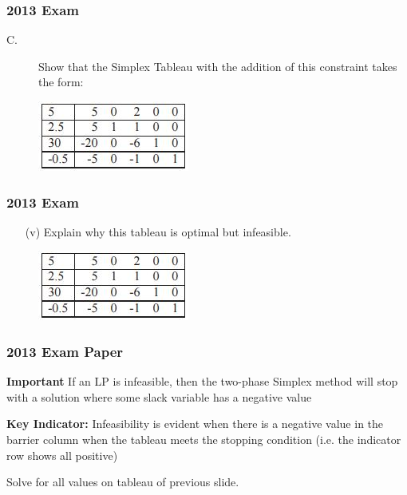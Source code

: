 \documentclass{beamer}
\begin{document}
\begin{frame}
\frametitle{2013 Exam}
\large
\begin{description}
	\item[C.] 
Show that the Simplex Tableau with the addition of this constraint
takes the form: 
\end{description}
\begin{figure}
\centering
\includegraphics[width=0.7\linewidth]{exam13-c}

\end{figure}

\end{frame}
\begin{frame}
	\frametitle{2013 Exam}
	\large
	\begin{itemize}
		\item[(v)] Explain why this tableau is optimal but infeasible. 
	\end{itemize}
	
	
	\begin{figure}
		\centering
		\includegraphics[width=0.7\linewidth]{Exam13-c}
	\end{figure}
	
\end{frame}
\begin{frame}
	\frametitle{2013 Exam Paper}
	\large
\noindent \textbf{Important} If an LP is infeasible, then the two-phase Simplex method will stop with a solution where some slack variable has a negative value
\\
\begin{framed}
\textbf{Key Indicator:}  Infeasibility is evident when there is a negative value in the barrier column when the tableau meets the stopping condition (i.e. the indicator row shows all positive)
\end{framed}
Solve for all values on tableau of previous slide.
\end{frame}
\end{document}
